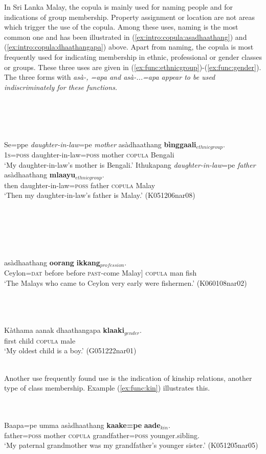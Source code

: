 \documentclass[a4paper,12pt]{article}
\newcommand{\xbox}[2]{\noindent\parbox[t]{#1}{#2}\noindent}
\newcommand{\xref}[1]{(\ref{#1})}
\newcommand{\ea}{\\\\}
\newcommand{\z}{\\\\}
\begin{document}
In Sri Lanka Malay, the copula is mainly used for naming people and for indications of group membership. Property assignment or location are not areas which trigger the use of the copula. Among these uses, naming   is the most common one and has been illustrated in \xref{ex:intro:copula:asadhaathang} and \xref{ex:intro:copula:dhaathangapa} above.
Apart from naming, the copula is most frequently used for indicating membership in ethnic,  professional or gender classes or groups. These three uses are given in \xref{ex:func:ethnicgroup}-\xref{ex:func:gender}. The three forms with \em asà-, =apa \em and \em asà-...=apa \em appear to be used indiscriminately for these functions.


\xbox{\textwidth}{
\ea\label{ex:func:ethnicgroup}
\ea
\gll Se=ppe    {\em daughter-in-law}=pe {\em mother}  asàdhaathang \textbf{bìnggaali}$_{ethnic group}$. \\
      \textsc{1s}=\textsc{poss} daughter-in-law=\textsc{poss} mother \textsc{copula} Bengali \\
    `My daughter-in-law's mother is Bengali.'
\ex
\gll Ithukapang       {\em daughter-in-law}=pe     {\em father}  asàdhaathang \textbf{mlaayu}$_{ethnic group}$. \\
      then daughter-in-law=\textsc{poss} father \textsc{copula} Malay \\
    `Then my daughter-in-law's father is Malay.' (K051206nar08)
\z
\z
}

\xbox{\textwidth}{
\ea\label{ex:func:profession}
\gll [Seelong=nang  duppang duppang anà-dhaathang  mlaayu] asàdhaathang \textbf{oorang} \textbf{ikkang}$_{profession}$. \\
      Ceylon=\textsc{dat} before before \textsc{past}-come Malay] \textsc{copula} man fish \\
    `The Malays who came to Ceylon very early were fishermen.' (K060108nar02)
\z
}

\xbox{\textwidth}{
\ea\label{ex:func:gender}
\gll Kàthama aanak dhaathangapa \textbf{klaaki}$_{gender}$. \\
      first child \textsc{copula} male \\
    `My oldest child is a boy.' (G051222nar01)
\z
}


Another use frequently found use is the indication of kinship relations, another type of class membership. Example  \xref{ex:func:kin} illustrates this.

\xbox{\textwidth}{
\ea\label{ex:func:kin} 
\gll Baapa=pe      umma   asàdhaathang  \textbf{kaake=pe}           \textbf{aade}$_{kin}$. \\
    father=\textsc{poss} mother \textsc{copula} grandfather=\textsc{poss} younger.sibling. \\
    `My paternal grandmother was my grandfather's younger sister.' (K051205nar05)
\z
}
\end{document}
